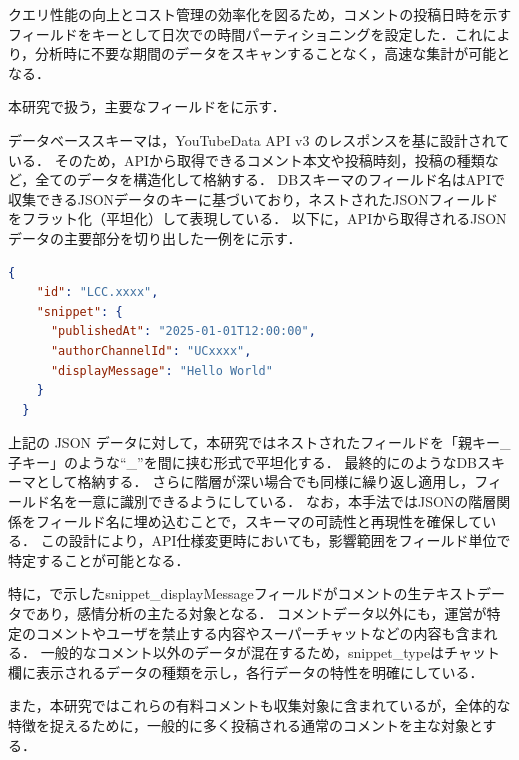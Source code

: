   クエリ性能の向上とコスト管理の効率化を図るため，コメントの投稿日時を示すフィールドをキーとして日次での時間パーティショニングを設定した．これにより，分析時に不要な期間のデータをスキャンすることなく，高速な集計が可能となる．

  本研究で扱う，主要なフィールドをに示す．

  

  データベーススキーマは，YouTubeData API v3 のレスポンスを基に設計されている．
  そのため，APIから取得できるコメント本文や投稿時刻，投稿の種類など，全てのデータを構造化して格納する．
  DBスキーマのフィールド名はAPIで収集できるJSONデータのキーに基づいており，ネストされたJSONフィールドをフラット化（平坦化）して表現している．
  以下に，APIから取得されるJSONデータの主要部分を切り出した一例をに示す．

  \begin{lstlisting}[language=json, caption={Example of JSON format}, label={lst:json}]
  {
    "id": "LCC.xxxx",
    "snippet": {
      "publishedAt": "2025-01-01T12:00:00",
      "authorChannelId": "UCxxxx",
      "displayMessage": "Hello World"
    }
  }
\end{lstlisting}

  上記の JSON データに対して，本研究ではネストされたフィールドを「親キー\_子キー」のような``\_''を間に挟む形式で平坦化する．
  最終的にのようなDBスキーマとして格納する．
  さらに階層が深い場合でも同様に繰り返し適用し，フィールド名を一意に識別できるようにしている．
  なお，本手法ではJSONの階層関係をフィールド名に埋め込むことで，スキーマの可読性と再現性を確保している．
  この設計により，API仕様変更時においても，影響範囲をフィールド単位で特定することが可能となる．
  
  特に，で示したsnippet\_displayMessageフィールドがコメントの生テキストデータであり，感情分析の主たる対象となる．
  コメントデータ以外にも，運営が特定のコメントやユーザを禁止する内容やスーパーチャットなどの内容も含まれる．
  一般的なコメント以外のデータが混在するため，snippet\_typeはチャット欄に表示されるデータの種類を示し，各行データの特性を明確にしている．

  また，本研究ではこれらの有料コメントも収集対象に含まれているが，全体的な特徴を捉えるために，一般的に多く投稿される通常のコメントを主な対象とする．

